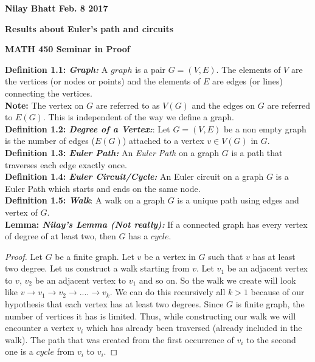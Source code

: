 \documentclass[12pt, fullpage]{article}
\begin{document}
\begin{flushleft}
\textbf{Nilay Bhatt Feb. 8 2017}		
\end{flushleft}
\begin{center}
	\textbf{Results about Euler's path and circuits}
\end{center}
\begin{center}
		
{\bf MATH 450 Seminar in Proof}
 \\
\end{center}
\textbf{Definition 1.1: \textit{Graph: }}A $graph$ is a pair $G = (V,E)$. The elements of $V$ are the vertices (or nodes or points) and the elements of $E$ are edges (or lines) connecting the vertices.\\

\textbf{Note:}	The vertex on $G$ are referred to as $V(G)$ and the edges on $G$ are referred to $E(G)$. This is independent of the way we define a graph.\\

\textbf{Definition 1.2: \textit{Degree of a Vertex:}}: Let $G = (V,E)$ be a non empty graph is the number of edges ($E(G)$) attached to a vertex $v \in V(G)$ in $G$.\\

\textbf{Definition 1.3: \textit{Euler Path: }}An \textit{Euler Path} on a graph $G$ is a path that traverses each edge exactly once.\\

\textbf{Definition 1.4: \textit{Euler Circuit/Cycle: }}An Euler circuit on a graph $G$ is a Euler Path which starts and ends on the same node.\\

\textbf{Definition 1.5: \textit{Walk}}: A walk on a graph $G$ is a unique path using edges and vertex of $G$.\\

\textbf{Lemma: \textit{Nilay's Lemma (Not really):}} If a connected graph has every vertex of degree of at least two, then $G$ has a $cycle$.
\begin{proof}
Let $G$ be a finite graph. Let $v$ be a vertex in $G$ such that $v$ has at least two degree. Let us construct a walk starting from $v$. Let $v_1$ be an adjacent vertex to $v$, $v_2$ be an adjacent vertex to $v_1$ and so on. So the walk we create will look like $v \rightarrow v_1 \rightarrow v_2 \rightarrow ....\rightarrow v_k$. We can do this recursively all $k>1$ because of our hypothesis that each vertex has at least two degrees. Since $G$ is finite graph, the number of vertices it has is limited. Thus, while constructing our walk we will encounter a vertex $v_i$ which has already been traversed (already included in the walk). The path that was created from the first occurrence of $v_i$ to the second one is a $cycle$ from $v_i$ to $v_i$.
\end{proof}
\end{document}
